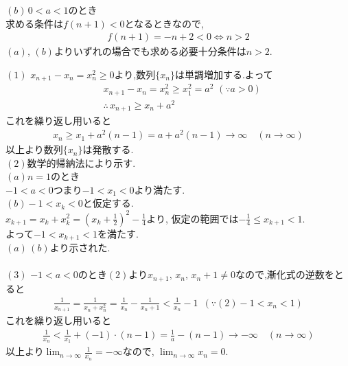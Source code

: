 \documentclass[main]{subfiles}
\begin{document}
\begin{answer}
$(b) \, 0<a<1$のとき \\
求める条件は$f(n+1)<0$となるときなので,
\begin{align*}
f(n+1)=-n+2 < 0 \Longleftrightarrow n>2
\end{align*}
$(a), \, (b)$よりいずれの場合でも求める必要十分条件は$n>2$.
\end{answer}


\begin{answer}
$(1)$
$x_{n+1} - x_{n} = x_{n}^{2} \ge 0$より,数列$\{ x_{n} \}$は単調増加する.よって
\begin{align*}
&x_{n+1} - x_{n} = x_{n}^{2} \ge x_{1}^{2} = a^{2} \,\, (\because a>0)\\
&\therefore \, x_{n+1} \ge x_{n} +a^{2}
\end{align*}
これを繰り返し用いると
\begin{align*}
x_{n} \ge x_{1} +a^{2} (n-1) = a +a^{2} (n-1) \to \infty \quad (n \to \infty)
\end{align*}
以上より数列$\{ x_{n} \}$は発散する.\\

$(2)$数学的帰納法により示す.\\
$(a)n=1$のとき\\
$-1<a<0$つまり$-1<x_{1}<0$より満たす.\\
$(b) -1<x_{k} <0$と仮定する.\\
$\displaystyle x_{k+1} = x_{k} + x_{k}^{2} =\left(x_{k}+\frac{1}{2} \right)^{2} -\frac{1}{4}$より,
仮定の範囲では$-\displaystyle\frac{1}{4} \le x_{k+1} < 1.$\\
よって$-1<x_{k+1}<1$を満たす.\\
$(a) \,(b)$より示された. \\
\\

$(3)$
$-1<a<0$のとき$(2)$より$x_{n+1}, \, x_{n}, \, x_{n}+1 \neq 0$なので,漸化式の逆数をとると
\begin{align*}
\frac{1}{x_{n+1}} = \frac{1}{x_{n}+x_{n}^{2}}
= \frac{1}{x_{n}} - \frac{1}{x_{n}+1}
< \frac{1}{x_{n}} -1 \,\,\, \left(\because (2)-1<x_{n}<1\right)
\end{align*}
これを繰り返し用いると
\begin{align*}
\frac{1}{x_{n}} < \frac{1}{x_{1}} + (-1) \cdot (n-1) = \frac{1}{a} -(n-1) \to -\infty \quad (n \to \infty)
\end{align*}
以上より$\displaystyle\lim_{n \to \infty}\frac{1}{x_{n}} = - \infty$なので,
$\displaystyle\lim_{n \to \infty} x_{n} =0$.
\end{answer}

 

 

 

 

 

 
\end{document}
